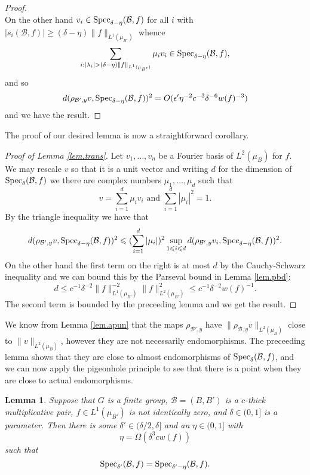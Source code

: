 \documentclass[12pt]{amsart}
\numberwithin{equation}{section}
\theoremstyle{plain}
\newtheorem{lemma}[subsection]{Lemma}
\theoremstyle{definition}
\renewcommand{\leq}{\leqslant}
\renewcommand{\geq}{\geqslant}
\providecommand{\Spec}{\mathop{\rm Spec}\nolimits}
\begin{document}
\begin{proof}
\begin{equation*}
\end{equation*}
On the other hand $v_i \in \Spec_{\delta-\eta}(\mathcal{B},f)$ for all $i$ with $|s_i(\mathcal{B},f)| \geq (\delta - \eta)\|f\|_{L^1(\mu_{B'})}$ whence
\begin{equation*}
\sum_{i: |\lambda_i| > (\delta-\eta)\|f\|_{L^1(\mu_{B'})}}{\mu_iv_i} \in \Spec_{\delta-\eta}(\mathcal{B},f),
\end{equation*}
and so
\begin{equation*}
d(\rho_{\mathcal{B}',y}v, \Spec_{\delta-\eta}(\mathcal{B},f))^2 =O( \epsilon'\eta^{-2}c^{-3}\delta^{-6}w(f)^{-3})
\end{equation*}
and we have the result.
\end{proof}
The proof of our desired lemma is now a straightforward corollary.
\begin{proof}[Proof of Lemma \ref{lem.trans}]
Let $v_1,\dots,v_n$ be a Fourier basis of $L^2(\mu_B)$ for $f$.  We may rescale $v$ so that it is a unit vector and writing $d$ for the dimension of $\Spec_{\delta}(\mathcal{B},f)$ we there are complex numbers $\mu_1,\dots,\mu_d$ such that
\begin{equation*}
v=\sum_{i=1}^d{\mu_iv_i} \textrm{ and } \sum_{i=1}^d{|\mu_i|^2}=1.
\end{equation*}
By the triangle inequality we have that
\begin{equation*}
d(\rho_{\mathcal{B}',y}v,\Spec_{\delta-\eta}(\mathcal{B},f))^2 \leq (\sum_{i=1}^d{|\mu_i|})^2\sup_{1 \leq i \leq d}{d(\rho_{\mathcal{B}',y}v_i,\Spec_{\delta-\eta}(\mathcal{B},f))^2}.
\end{equation*}
On the other hand the first term on the right is at most $d$ by the Cauchy-Schwarz inequality and we can bound this by the Parseval bound in Lemma \ref{lem.pbd}:
\begin{equation*}
d \leq c^{-1}\delta^{-2}\|f\|_{L^1(\mu_{B'})}^{-2}\|f\|_{L^2(\mu_{B'})}^2 \leq c^{-1}\delta^{-2}w(f)^{-1}.
\end{equation*}
The second term is bounded by the preceeding lemma and we get the result.
\end{proof}
We know from Lemma \ref{lem.apun} that the maps $\rho_{\mathcal{B}',y}$ have $\|\rho_{\mathcal{B},y}v\|_{L^2(\mu_B)}$ close to $\|v\|_{L^2(\mu_B)}$, however they are not necessarily endomorphisms.  The preceeding lemma shows that they are close to almost endomorphisms of $\Spec_\delta(\mathcal{B},f)$, and we can now apply the pigeonhole principle to see that there is a point when they are close to actual endomorphisms.
\begin{lemma}\label{lem.pcore}
Suppose that $G$ is a finite group, $\mathcal{B}=(B,B')$ is a $c$-thick multiplicative pair, $f \in L^1(\mu_{B'})$ is not identically zero, and $\delta \in (0,1]$ is a parameter.  Then there is some $\delta' \in (\delta/2,\delta]$ and an $\eta \in (0,1]$ with 
\begin{equation*}
\eta = \Omega(\delta^3c w(f))
\end{equation*}
such that
\begin{equation*}
\Spec_{\delta'}(\mathcal{B},f) = \Spec_{\delta'-\eta}(\mathcal{B},f).
\end{equation*}
\end{lemma}
\end{document}
